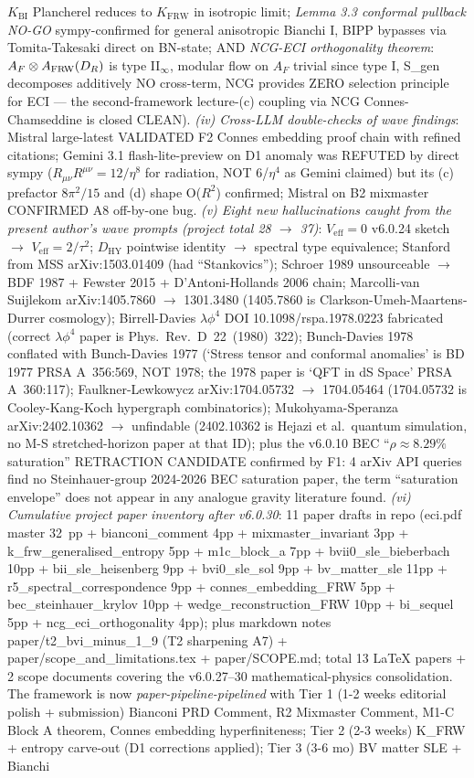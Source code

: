 \documentclass[reprint,amsmath,amssymb,aps,prd,superscriptaddress]{revtex4-2}
\providecommand{\1}{\mathbf{1}}
\begin{document}
$K_\mathrm{BI}$ Plancherel reduces to $K_\mathrm{FRW}$ in isotropic limit; \emph{Lemma 3.3 conformal pullback NO-GO} sympy-confirmed for general anisotropic Bianchi I, BIPP bypasses via Tomita-Takesaki direct on BN-state; AND \emph{NCG-ECI orthogonality theorem}: $A_F\otimes A_{\rm FRW}(D_R)$ is type II$_\infty$, modular flow on $A_F$ trivial since type I, S\_gen decomposes additively NO cross-term, NCG provides ZERO selection principle for ECI --- the second-framework lecture-(c) coupling via NCG Connes-Chamseddine is closed CLEAN). \emph{(iv) Cross-LLM double-checks of wave findings}: Mistral large-latest VALIDATED F2 Connes embedding proof chain with refined citations; Gemini 3.1 flash-lite-preview on D1 anomaly was REFUTED by direct sympy ($R_{\mu\nu}R^{\mu\nu}=12/\eta^8$ for radiation, NOT 6/$\eta^4$ as Gemini claimed) but its (c) prefactor $8\pi^2/15$ and (d) shape O($R^2$) confirmed; Mistral on B2 mixmaster CONFIRMED A8 off-by-one bug. \emph{(v) Eight new hallucinations caught from the present author's wave prompts (project total 28 $\to$ 37)}: $V_\mathrm{eff}=0$ v6.0.24 sketch $\to$ $V_\mathrm{eff}=2/\tau^2$; $D_\mathrm{HY}$ pointwise identity $\to$ spectral type equivalence; Stanford from MSS arXiv:1503.01409 (had ``Stankovics''); Schroer 1989 unsourceable $\to$ BDF 1987 + Fewster 2015 + D'Antoni-Hollands 2006 chain; Marcolli-van Suijlekom arXiv:1405.7860 $\to$ 1301.3480 (1405.7860 is Clarkson-Umeh-Maartens-Durrer cosmology); Birrell-Davies $\lambda\phi^4$ DOI 10.1098/rspa.1978.0223 fabricated (correct $\lambda\phi^4$ paper is Phys.~Rev.~D~22~(1980)~322); Bunch-Davies 1978 conflated with Bunch-Davies 1977 (`Stress tensor and conformal anomalies' is BD 1977 PRSA A~356:569, NOT 1978; the 1978 paper is `QFT in dS Space' PRSA A~360:117); Faulkner-Lewkowycz arXiv:1704.05732 $\to$ 1704.05464 (1704.05732 is Cooley-Kang-Koch hypergraph combinatorics); Mukohyama-Speranza arXiv:2402.10362 $\to$ unfindable (2402.10362 is Hejazi et al.\ quantum simulation, no M-S stretched-horizon paper at that ID); plus the v6.0.10 BEC ``$\rho\approx 8.29\%$ saturation'' RETRACTION CANDIDATE confirmed by F1: 4 arXiv API queries find no Steinhauer-group 2024-2026 BEC saturation paper, the term ``saturation envelope'' does not appear in any analogue gravity literature found. \emph{(vi) Cumulative project paper inventory after v6.0.30}: 11 paper drafts in repo (eci.pdf master 32~pp + bianconi\_comment 4pp + mixmaster\_invariant 3pp + k\_frw\_generalised\_entropy 5pp + m1c\_block\_a 7pp + bvii0\_sle\_bieberbach 10pp + bii\_sle\_heisenberg 9pp + bvi0\_sle\_sol 9pp + bv\_matter\_sle 11pp + r5\_spectral\_correspondence 9pp + connes\_embedding\_FRW 5pp + bec\_steinhauer\_krylov 10pp + wedge\_reconstruction\_FRW 10pp + bi\_sequel 5pp + ncg\_eci\_orthogonality 4pp); plus markdown notes paper/t2\_bvi\_minus\_1\_9 (T2 sharpening A7) + paper/scope\_and\_limitations.tex + paper/SCOPE.md; total 13 LaTeX papers + 2 scope documents covering the v6.0.27--30 mathematical-physics consolidation. The framework is now \emph{paper-pipeline-pipelined} with Tier 1 (1-2 weeks editorial polish + submission) Bianconi PRD Comment, R2 Mixmaster Comment, M1-C Block A theorem, Connes embedding hyperfiniteness; Tier 2 (2-3 weeks) K\_FRW + entropy carve-out (D1 corrections applied); Tier 3 (3-6 mo) BV matter SLE + Bianchi 
\end{document}

